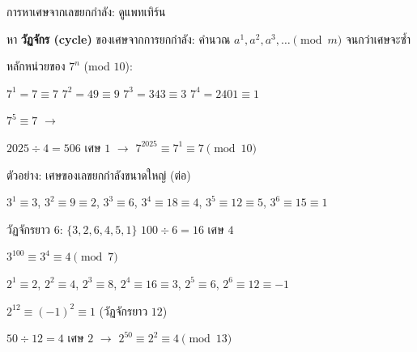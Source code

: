 \documentclass[11pt, aspectratio=169]{beamer}
\begin{document}
\begin{frame}{การหาเศษจากเลขยกกำลัง: ดูแพทเทิร์น}
  \begin{explanation}[แนวคิด]
    หา \textbf{วัฏจักร (cycle)} ของเศษจากการยกกำลัง:
    คำนวณ $a^1, a^2, a^3, \ldots \pmod{m}$ จนกว่าเศษจะซํ้า
  \end{explanation}

  \begin{exambox}
    หลักหน่วยของ $7^n$ (mod $10$):

    $7^1 = 7 \equiv 7$ \quad
    $7^2 = 49 \equiv 9$ \quad
    $7^3 = 343 \equiv 3$ \quad
    $7^4 = 2401 \equiv 1$

    $7^5 \equiv 7$ \quad $\rightarrow$ 

    $2025 \div 4 = 506$ เศษ $1$ \quad $\rightarrow$ \quad $7^{2025} \equiv 7^1 \equiv 7 \pmod{10}$

  \end{exambox}
\end{frame}

\begin{frame}{ตัวอย่าง: เศษของเลขยกกำลังขนาดใหญ่ (ต่อ)}
  \begin{exambox}
    $3^1 \equiv 3$,\; $3^2 \equiv 9 \equiv 2$,\;
    $3^3 \equiv 6$,\; $3^4 \equiv 18 \equiv 4$,\;
    $3^5 \equiv 12 \equiv 5$,\; $3^6 \equiv 15 \equiv 1$

    วัฏจักรยาว $6$: $\{3, 2, 6, 4, 5, 1\}$ \quad
    $100 \div 6 = 16$ เศษ $4$

    $3^{100} \equiv 3^4 \equiv 4 \pmod{7}$
  \end{exambox}

  \begin{exambox}
    $2^1 \equiv 2$,\; $2^2 \equiv 4$,\; $2^3 \equiv 8$,\;
    $2^4 \equiv 16 \equiv 3$,\; $2^5 \equiv 6$,\;
    $2^6 \equiv 12 \equiv -1$

    $2^{12} \equiv (-1)^2 \equiv 1$ \quad (วัฏจักรยาว $12$)

    $50 \div 12 = 4$ เศษ $2$ \quad $\rightarrow$ \quad
    $2^{50} \equiv 2^2 \equiv 4 \pmod{13}$
  \end{exambox}
\end{frame}
\end{document}
